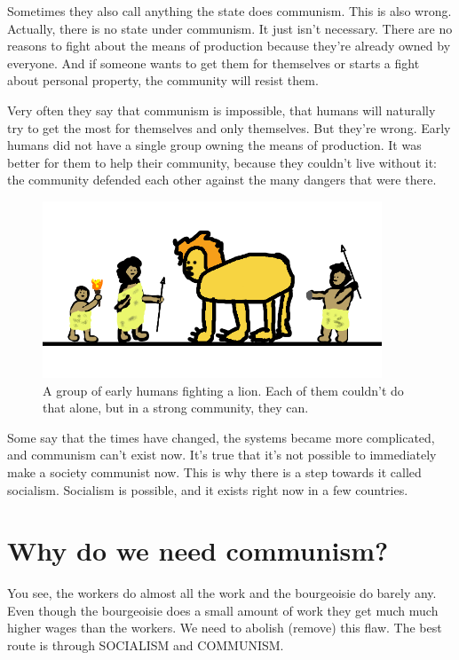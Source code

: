 \documentclass[a4paper]{book} %
\begin{document}
Sometimes they also call anything the state does communism. This is also wrong. Actually, there is no state under communism. It just isn't necessary. There are no reasons to fight about the means of production because they're already owned by everyone. And if someone wants to get them for themselves or starts a fight about personal property, the community will resist them.

Very often they say that communism is impossible, that humans will naturally try to get the most for themselves and only themselves. But they're wrong. Early humans did not have a single group owning the means of production. It was better for them to help their community, because they couldn't live without it: the community defended each other against the many dangers that were there.

\begin{figure}[tbhp]
\centering
\includegraphics[width=0.9\textwidth]{1-2.png}
\caption{A group of early humans fighting a lion. Each of them couldn't do that alone, but in a strong community, they can.}
\end{figure}

Some say that the times have changed, the systems became more complicated, and communism can't exist now. It's true that it's not possible to immediately make a society communist now. This is why there is a step towards it called socialism. Socialism is possible, and it exists right now in a few countries.

\chapter{Why do we need communism?}

You see, the workers do almost all the work and the bourgeoisie do barely any. Even though the bourgeoisie does a small amount of work they get much much higher wages than the workers. We need to abolish (remove) this flaw. The best route is through SOCIALISM and COMMUNISM.
\end{document}

